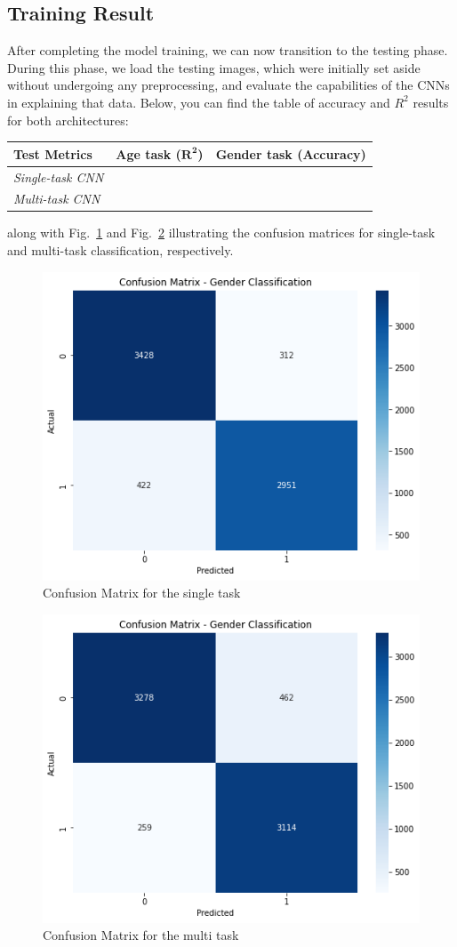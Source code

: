 \subsection{Training Result}

After completing the model training, we can now transition to the testing
phase. During this phase, we load the testing images, which were initially
set aside without undergoing any preprocessing, and evaluate
the capabilities of the CNNs in explaining that data.
Below, you can find the table of accuracy and $R^2$ results for both
architectures:
\begin{table}[H]
    \centering
    \begin{tabular}{@{}lll@{}}
    \toprule
    Test Metrics & \textbf{Age task ($\mathbf{R^2}$)} & \textbf{Gender task (Accuracy)} \\ \midrule
    \textit{Single-task CNN} &                   &                      \\
    \textit{Multi-task CNN}  &                   &                      \\ \bottomrule
    \end{tabular}
\end{table}
along with Fig.~\ref{6mat} and Fig.~\ref{7mat} illustrating the
confusion matrices for single-task
and multi-task classification, respectively.
\begin{figure}[htbp]
    \centerline{\includegraphics[width=.4\textwidth]{images/testing/mat_single.png}}
    \caption{Confusion Matrix for the single task}
    \label{6mat}
\end{figure}
\begin{figure}[htbp]
    \centerline{\includegraphics[width=.4\textwidth]{images/testing/mat_multi.png}}
    \caption{Confusion Matrix for the multi task}
    \label{7mat}
\end{figure}
